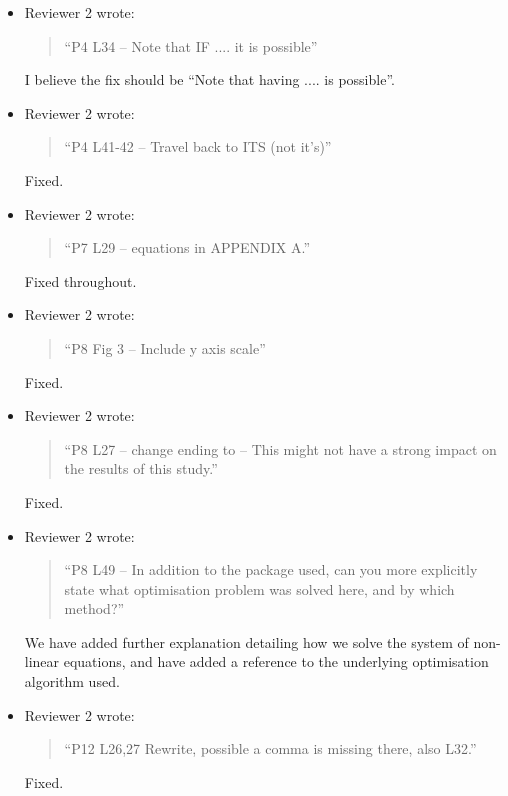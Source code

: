 \documentclass{article}
\begin{document}
\begin{itemize}
\item Reviewer 2 wrote:
\begin{quote}
``P4 L34 – Note that IF .... it is possible''
\end{quote}
I believe the fix should be ``Note that having .... is possible''.

\item Reviewer 2 wrote:
\begin{quote}
``P4 L41-42 – Travel back to ITS (not it’s)''
\end{quote}
Fixed.

\item Reviewer 2 wrote:
\begin{quote}
``P7 L29 – equations in APPENDIX A.''
\end{quote}
Fixed throughout.

\item Reviewer 2 wrote:
\begin{quote}
``P8 Fig 3 – Include y axis scale''
\end{quote}
Fixed.

\item Reviewer 2 wrote:
\begin{quote}
``P8 L27 – change ending to – This might not have a strong impact on the results of this study.''
\end{quote}
Fixed.

\item Reviewer 2 wrote:
\begin{quote}
``P8 L49 – In addition to the package used, can you more explicitly state what optimisation problem was solved here, and by which method?''
\end{quote}
We have added further explanation detailing how we solve the system of non-linear equations, and have added a reference to the underlying optimisation algorithm used.

\item Reviewer 2 wrote:
\begin{quote}
``P12 L26,27 Rewrite, possible a comma is missing there, also L32.''
\end{quote}
Fixed.

\end{itemize}
\end{document}
